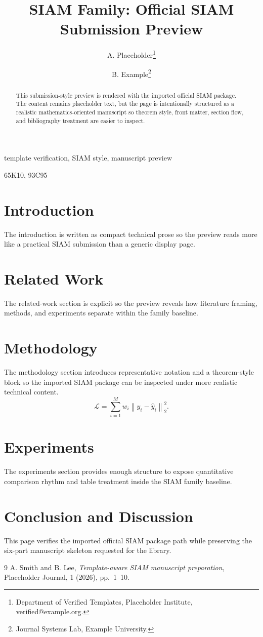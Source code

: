 \documentclass[final]{siamltex}
\title{SIAM Family: Official SIAM Submission Preview}
\author{A. Placeholder\thanks{Department of Verified Templates, Placeholder Institute, verified@example.org.}
\and B. Example\thanks{Journal Systems Lab, Example University.}}
\begin{document}
\maketitle
\begin{abstract}
This submission-style preview is rendered with the imported official SIAM package. The content remains placeholder text, but the page is intentionally structured as a realistic mathematics-oriented manuscript so theorem style, front matter, section flow, and bibliography treatment are easier to inspect.
\end{abstract}
\begin{keywords}
template verification, SIAM style, manuscript preview
\end{keywords}
\begin{AMS}
65K10, 93C95
\end{AMS}
\section{Introduction}
The introduction is written as compact technical prose so the preview reads more like a practical SIAM submission than a generic display page.
\section{Related Work}
The related-work section is explicit so the preview reveals how literature framing, methods, and experiments separate within the family baseline.
\section{Methodology}
The methodology section introduces representative notation and a theorem-style block so the imported SIAM package can be inspected under more realistic technical content.
\begin{equation}
\mathcal{L} = \sum_{i=1}^{M} w_i \left\| y_i - \hat{y}_i \right\|_2^2.
\end{equation}
\section{Experiments}
The experiments section provides enough structure to expose quantitative comparison rhythm and table treatment inside the SIAM family baseline.
\section{Conclusion and Discussion}
This page verifies the imported official SIAM package path while preserving the six-part manuscript skeleton requested for the library.
\begin{thebibliography}{9}
 A. Smith and B. Lee, {\em Template-aware SIAM manuscript preparation}, Placeholder Journal, 1 (2026), pp.~1--10.
\end{thebibliography}
\end{document}
